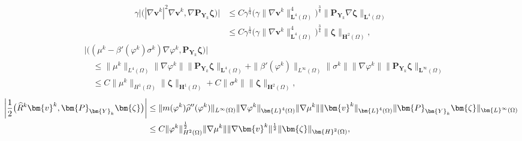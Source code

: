 \documentclass[11pt,reqno]{amsart}
\def\vv{\bm{v}}
\begin{document}
%
\begin{align*}
\gamma \big|\big(|\nabla\vv^k|^2\nabla\vv^k,\nabla \bm{P}_{\bm{Y}_{k}}\bm{\zeta}\big)\big|
& \leq C\gamma^\frac14\big(\gamma \|\nabla\vv^k\|_{\bm{L}^4(\Omega)}^4\big)^\frac34 \|\bm{P}_{\bm{Y}_{k}}\nabla \bm{\zeta}\|_{\bm{L}^4(\Omega)}
\\
&\leq C\gamma^\frac14\big(\gamma \|\nabla\vv^k\|_{\bm{L}^4(\Omega)}^4\big)^\frac34 \|\bm{\zeta}\|_{\bm{H}^2(\Omega)},
\end{align*}
%
\begin{align*}
&\big|\big((\mu^{k} -\beta'(\varphi^k) \sigma^{k})\nabla \varphi^{k},\bm{P}_{\bm{Y}_{k}}\bm {\zeta}\big)\big|
\\
&\quad \leq \|\mu^k\|_{L^4(\Omega)}\|\nabla \varphi^k\|\|\bm{P}_{\bm{Y}_{k}}\bm{\zeta}  \|_{\bm{L}^4(\Omega)}
+ \|\beta'(\varphi^k)\|_{L^\infty(\Omega)}\|\sigma^k\|\|\nabla \varphi^k\|\|\bm{P}_{\bm{Y}_{k}}\bm{\zeta}  \|_{\bm{L}^\infty(\Omega)}
\\
&\quad \leq C\|\mu^k\|_{H^1(\Omega)}\|\bm{\zeta} \|_{\bm{H}^1(\Omega)}
+ C \|\sigma^k\|\|\bm{\zeta}\|_{\bm{H}^2(\Omega)},
\end{align*}
%
\begin{align}
\left|\frac12 \big(\widehat{R}^k\vv^k,\bm{P}_{\bm{Y}_{k}}\bm{\zeta}\big)\right|
& \leq  \|m(\varphi^k) \widehat{\rho}''(\varphi^k)\|_{L^\infty(\Omega)} \|\nabla  \varphi^k\|_{\bm{L}^4(\Omega)}\|  \nabla \mu^k\|\|\vv^k\|_{\bm{L}^4(\Omega)}\|\bm{P}_{\bm{Y}_{k}}\bm{\zeta}  \|_{\bm{L}^\infty(\Omega)}
\notag \\
&\leq C\|\varphi^k\|_{H^2(\Omega)}^\frac12 \|  \nabla \mu^k\|\|\nabla \vv^k\|^\frac12
\|\bm{\zeta}  \|_{\bm{H}^2(\Omega)},
\label{es-Rhat}
\end{align}
%
\end{document}
